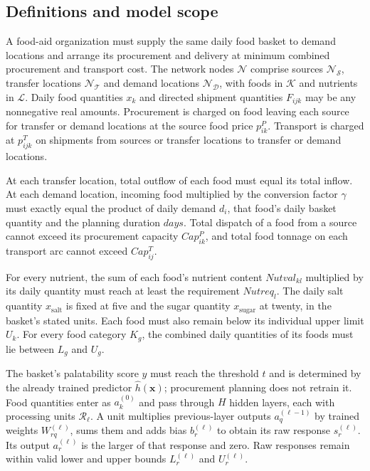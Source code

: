\documentclass[10pt]{article}
\begin{document}
\subsection*{Definitions and model scope}
A food-aid organization must supply the same daily food basket to demand locations and arrange its procurement and delivery at minimum combined procurement and transport cost. The network nodes $\mathcal N$ comprise sources $\mathcal N_{\mathcal S}$, transfer locations $\mathcal N_{\mathcal T}$ and demand locations $\mathcal N_{\mathcal D}$, with foods in $\mathcal K$ and nutrients in $\mathcal L$. Daily food quantities $x_k$ and directed shipment quantities $F_{ijk}$ may be any nonnegative real amounts. Procurement is charged on food leaving each source for transfer or demand locations at the source food price $p_{ik}^P$. Transport is charged at $p_{ijk}^T$ on shipments from sources or transfer locations to transfer or demand locations.

At each transfer location, total outflow of each food must equal its total inflow. At each demand location, incoming food multiplied by the conversion factor $\gamma$ must exactly equal the product of daily demand $d_i$, that food's daily basket quantity and the planning duration $days$. Total dispatch of a food from a source cannot exceed its procurement capacity $Cap^P_{ik}$, and total food tonnage on each transport arc cannot exceed $Cap^T_{ij}$.

For every nutrient, the sum of each food's nutrient content $Nutval_{kl}$ multiplied by its daily quantity must reach at least the requirement $Nutreq_l$. The daily salt quantity $x_{\mathrm{salt}}$ is fixed at five and the sugar quantity $x_{\mathrm{sugar}}$ at twenty, in the basket's stated units. Each food must also remain below its individual upper limit $U_k$. For every food category $K_g$, the combined daily quantities of its foods must lie between $L_g$ and $U_g$.

The basket's palatability score $y$ must reach the threshold $t$ and is determined by the already trained predictor $\hat h(\boldsymbol{x})$; procurement planning does not retrain it. Food quantities enter as $a_k^{(0)}$ and pass through $H$ hidden layers, each with processing units $\mathcal R_\ell$. A unit multiplies previous-layer outputs $a_q^{(\ell-1)}$ by trained weights $W_{rq}^{(\ell)}$, sums them and adds bias $b_r^{(\ell)}$ to obtain its raw response $s_r^{(\ell)}$. Its output $a_r^{(\ell)}$ is the larger of that response and zero. Raw responses remain within valid lower and upper bounds $L_r^{(\ell)}$ and $U_r^{(\ell)}$.
\end{document}
